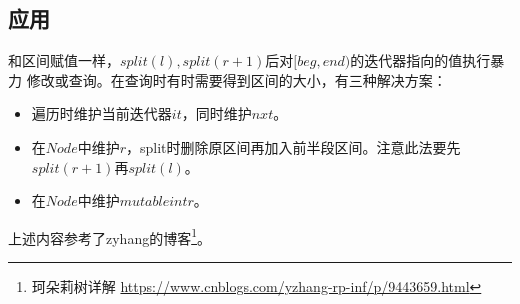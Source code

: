 \subsection{应用}
和区间赋值一样，$split(l),split(r+1)$后对$[beg,end)$的迭代器指向的值执行暴力
修改或查询。在查询时有时需要得到区间的大小，有三种解决方案：
\begin{itemize}
    \item 遍历时维护当前迭代器$it$，同时维护$nxt$。
    \item 在$Node$中维护$r$，split时删除原区间再加入前半段区间。注意此法要先
    $split(r+1)$再$split(l)$。
    \item 在$Node$中维护$mutable int r$。
\end{itemize}

上述内容参考了zyhang的博客\footnote{
    珂朵莉树详解
    \url{https://www.cnblogs.com/yzhang-rp-inf/p/9443659.html}
}。
